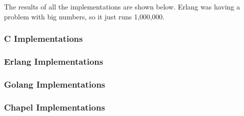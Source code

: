 \documentclass[12pt]{article}
\begin{document}
The results of all the implementations are shown below. Erlang was having a problem with big numbers, so it just runs 1,000,000.



\subsubsection{C Implementations}






\subsubsection{Erlang Implementations}




\subsubsection{Golang Implementations}



\subsubsection{Chapel Implementations}



\end{document}
